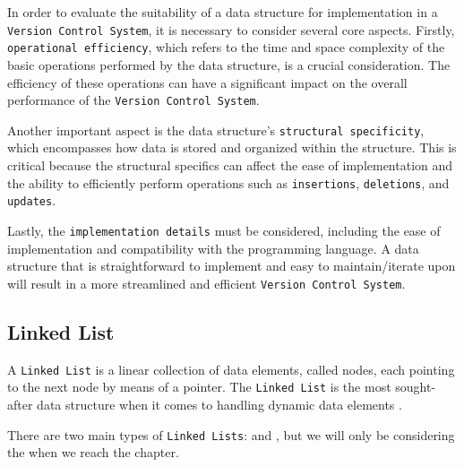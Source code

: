 In order to evaluate the suitability of a data structure for implementation in a \lstinline{Version Control System}, it is necessary to consider several core aspects. Firstly, \lstinline{operational efficiency}, which refers to the time and space complexity of the basic operations performed by the data structure, is a crucial consideration. The efficiency of these operations can have a significant impact on the overall performance of the \lstinline{Version Control System}.
\smallskip

Another important aspect is the data structure's \lstinline{structural specificity}, which encompasses how data is stored and organized within the structure. This is critical because the structural specifics can affect the ease of implementation and the ability to efficiently perform operations such as \lstinline{insertions}, \lstinline{deletions}, and \lstinline{updates}.
\smallskip

Lastly, the \lstinline{implementation details} must be considered, including the ease of implementation and compatibility with the programming language. A data structure that is straightforward to implement and easy to maintain/iterate upon will result in a more streamlined and efficient \lstinline{Version Control System}.
% 
% 
\subsection{Linked List}
\label{sec:linked-list}
A \lstinline{Linked List} is a linear collection of data elements, called nodes, each pointing to the next node by means of a pointer. The \lstinline{Linked List} is the most sought-after data structure when it comes to handling dynamic data elements \cite{ravikiran_2022}.
\smallskip

There are two main types of \lstinline{Linked Lists}:  and , but we will only be considering the  when we reach the  chapter.
